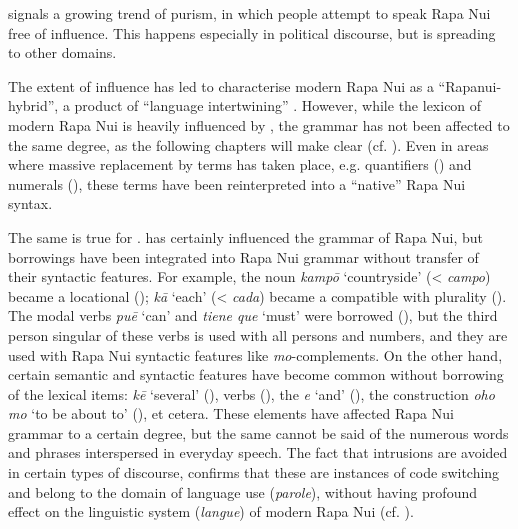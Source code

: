 \citet{Makihara1998,Makihara2009} signals a growing trend of purism, in which people attempt to speak Rapa Nui free of  influence. This happens especially in political discourse, but is spreading to other domains.

The extent of  influence has led \citet[47]{Fischer1996Review} to characterise modern Rapa Nui as a “Rapanui- hybrid”, a product of “language intertwining” \citep[151]{Fischer2008Reversing}. However, while the lexicon of modern Rapa Nui is heavily influenced by , the grammar has not been affected to the same degree, as the following chapters will make clear (cf. \citealt[194]{Makihara2001Adaptation}). Even in areas where massive replacement by  terms has taken place, e.g. quantifiers () and numerals (), these terms have been reinterpreted into a “native” Rapa Nui syntax.

The same is true for .  has certainly influenced the grammar of Rapa Nui, but  borrowings have been integrated into Rapa Nui grammar without transfer of their syntactic features. For example, the  noun \textit{kampō} ‘countryside’ ({\textless} \textit{campo}) became a locational (); \textit{kā} ‘each’ ({\textless} \textit{cada}) became a  compatible with plurality (). The modal verbs \textit{puē} ‘can’ and \textit{tiene que} ‘must’ were borrowed (), but the third person singular of these verbs is used with all persons and numbers, and they are used with Rapa Nui syntactic features like \textit{mo}{}-complements. On the other hand, certain  semantic and syntactic features have become common without borrowing of the lexical items: \textit{kē} ‘several’ (),  verbs (), the  \textit{{\ꞌ}e} ‘and’ (), the construction \textit{oho mo} ‘to be about to’ (), et cetera. These elements have affected Rapa Nui grammar to a certain degree, but the same cannot be said of the numerous  words and phrases interspersed in everyday speech. The fact that  intrusions are avoided in certain types of discourse, confirms that these are instances of code switching and belong to the domain of language use (\textit{parole}), without having profound effect on the linguistic system (\textit{langue}) of modern Rapa Nui (cf. \citealt[193]{Makihara2001Adaptation}).


